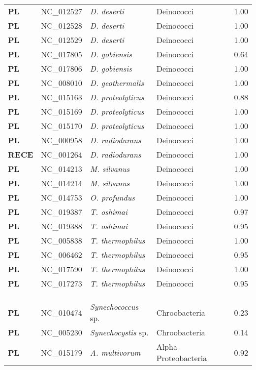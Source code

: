 \begin{adjustwidth}{-3cm}{2cm}
{\begin{supertabular}{>{\bfseries}l|p{0.1\textwidth}p{0.14\textwidth}l|l}
PL & NC\_012527 & \textit{D. deserti} & Deinococci & 1.00\\
PL & NC\_012528 & \textit{D. deserti} & Deinococci & 1.00\\
PL & NC\_012529 & \textit{D. deserti} & Deinococci & 1.00\\
PL & NC\_017805 & \textit{D. gobiensis} & Deinococci & 0.64\\
PL & NC\_017806 & \textit{D. gobiensis} & Deinococci & 1.00\\
PL & NC\_008010 & \textit{D. geothermalis} & Deinococci & 1.00\\
PL & NC\_015163 & \textit{D. proteolyticus} & Deinococci & 0.88\\
PL & NC\_015169 & \textit{D. proteolyticus} & Deinococci & 1.00\\
PL & NC\_015170 & \textit{D. proteolyticus} & Deinococci & 1.00\\
PL & NC\_000958 & \textit{D. radiodurans} & Deinococci & 1.00\\
RECE & NC\_001264 & \textit{D. radiodurans} & Deinococci & 1.00\\
PL & NC\_014213 & \textit{M. silvanus} & Deinococci & 1.00\\
PL & NC\_014214 & \textit{M. silvanus} & Deinococci & 1.00\\
PL & NC\_014753 & \textit{O. profundus} & Deinococci & 1.00\\
PL & NC\_019387 & \textit{T. oshimai} & Deinococci & 0.97\\
PL & NC\_019388 & \textit{T. oshimai} & Deinococci & 0.95\\
PL & NC\_005838 & \textit{T. thermophilus} & Deinococci & 1.00\\
PL & NC\_006462 & \textit{T. thermophilus} & Deinococci & 0.95\\
PL & NC\_017590 & \textit{T. thermophilus} & Deinococci & 1.00\\
PL & NC\_017273 & \textit{T. thermophilus} & Deinococci & 0.95\\
\\
\\
\hline\\
PL & NC\_010474 & \textit{Synechococcus} sp. & Chroobacteria & 0.23\\
PL & NC\_005230 & \textit{Synechocystis} sp. & Chroobacteria & 0.14\\
PL & NC\_015179 & \textit{A. multivorum} & Alpha-Proteobacteria & 0.92\\

\end{supertabular}}
\end{adjustwidth}
